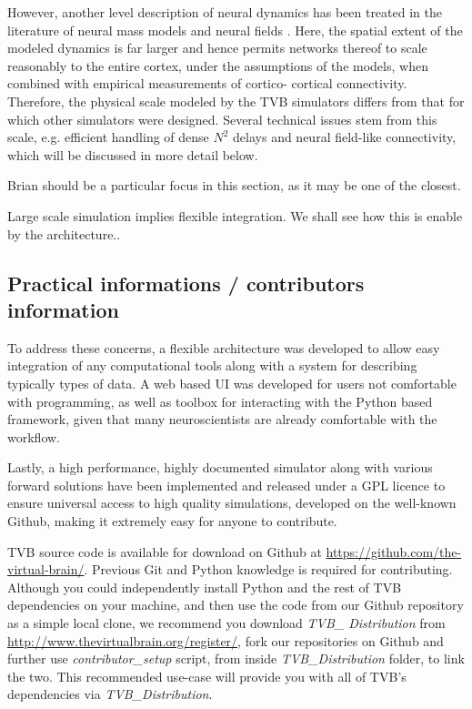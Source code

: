 However, another level description of neural dynamics has been treated
in the literature of neural mass models and neural fields 
\cite{Deco_2008a, Coombes_2010}. Here, the spatial
extent of the modeled dynamics is far larger and hence permits networks 
thereof to scale reasonably to the entire cortex, under the assumptions 
of the models, when combined with empirical measurements of cortico-
cortical connectivity. Therefore, the physical scale modeled by the TVB
simulators differs from that for which other simulators were designed.
Several technical issues stem from this scale, e.g. efficient handling
of dense $N^2$ delays and neural field-like connectivity, which will be
discussed in more detail below. 


	Brian should be a particular focus in this section, as it may
    be one of the closest.  

Large scale simulation implies flexible integration. We shall see
how this is enable by the architecture..

\subsection{Practical informations / contributors information}

To address these concerns, a flexible architecture was developed to
allow easy integration of any computational tools along with a system
for describing typically types of data. A web based UI was developed
for users not comfortable with programming, as well as \matlab{} toolbox
for interacting with the Python based framework, given that many
neuroscientists are already comfortable with the \matlab{} workflow.

Lastly, a high performance, highly documented simulator along with
various forward solutions have been implemented and released under a
GPL licence to ensure universal access to high quality simulations, 
developed on the well-known Github, making it extremely easy for 
anyone to contribute.

TVB source code is available for download on Github at
\url{https://github.com/the-virtual-brain/}.  Previous Git and Python knowledge
is required for contributing.  Although you could independently install Python
and the rest of TVB dependencies on your machine, and then use the code from our Github repository
as a simple local clone, we recommend you download \emph{TVB\_ Distribution}
from \url{http://www.thevirtualbrain.org/register/}, fork our repositories on
Github and further use \emph{contributor\_setup} script, from inside \emph{TVB\_Distribution} 
folder, to link the two.  This recommended use-case will provide you with
all of TVB's dependencies via \emph{TVB\_Distribution}.

